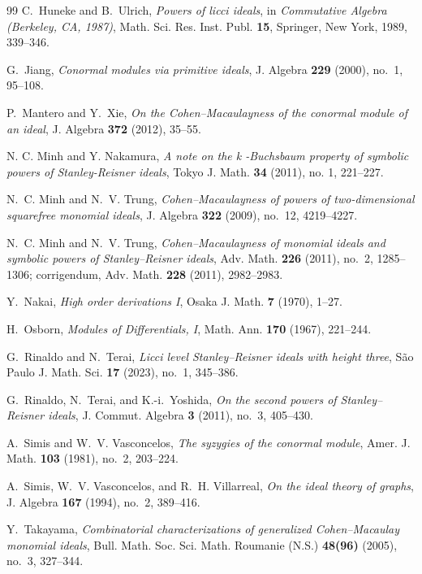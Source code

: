 \documentclass[12pt]{amsart}
\theoremstyle{plain}
\theoremstyle{definition}
\theoremstyle{remark}
\begin{document}
\begin{thebibliography}{99}
C.~Huneke and B.~Ulrich,
\emph{Powers of licci ideals},
in \emph{Commutative Algebra (Berkeley, CA, 1987)},
Math. Sci. Res. Inst. Publ. \textbf{15}, Springer, New York, 1989, 339--346.

G.~Jiang,
\emph{Conormal modules via primitive ideals},
J. Algebra \textbf{229} (2000), no.~1, 95--108.

P.~Mantero and Y.~Xie,
\emph{On the Cohen--Macaulayness of the conormal module of an ideal},
J. Algebra \textbf{372} (2012), 35--55.

N. C. Minh and Y. Nakamura,
\emph{A note on the  k -Buchsbaum property of symbolic powers of Stanley-Reisner ideals},
Tokyo J. Math. \textbf{34} (2011), no. 1, 221–227.

N.~C. Minh and N.~V. Trung,
\emph{Cohen--Macaulayness of powers of two-dimensional squarefree monomial ideals},
J. Algebra \textbf{322} (2009), no.~12, 4219--4227.

N.~C. Minh and N.~V. Trung,
\emph{Cohen--Macaulayness of monomial ideals and symbolic powers of Stanley--Reisner ideals},
Adv. Math. \textbf{226} (2011), no.~2, 1285--1306;
corrigendum, Adv. Math. \textbf{228} (2011), 2982--2983.

Y.~Nakai,
\emph{High order derivations I},
Osaka J. Math. \textbf{7} (1970), 1--27.

H.~Osborn,
\emph{Modules of Differentials, I},
Math. Ann. \textbf{170} (1967), 221--244.

G.~Rinaldo and N.~Terai,
\emph{Licci level Stanley--Reisner ideals with height three},
S\~ao Paulo J. Math. Sci. \textbf{17} (2023), no.~1, 345--386.

G.~Rinaldo, N.~Terai, and K.-i.~Yoshida,
\emph{On the second powers of Stanley--Reisner ideals},
J. Commut. Algebra \textbf{3} (2011), no.~3, 405--430.

A.~Simis and W.~V. Vasconcelos,
\emph{The syzygies of the conormal module},
Amer. J. Math. \textbf{103} (1981), no.~2, 203--224.

A.~Simis, W.~V. Vasconcelos, and R.~H. Villarreal,
\emph{On the ideal theory of graphs},
J. Algebra \textbf{167} (1994), no.~2, 389--416.

Y.~Takayama,
\emph{Combinatorial characterizations of generalized Cohen--Macaulay monomial ideals},
Bull. Math. Soc. Sci. Math. Roumanie (N.S.) \textbf{48(96)} (2005), no.~3,
327--344.


\end{thebibliography}
\end{document}
